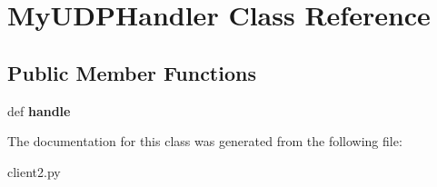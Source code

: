 \hypertarget{classclient2_1_1_my_u_d_p_handler}{\section{My\-U\-D\-P\-Handler Class Reference}
\label{classclient2_1_1_my_u_d_p_handler}
}
\subsection*{Public Member Functions}
\begin{DoxyCompactItemize}
\item 
\hypertarget{classclient2_1_1_my_u_d_p_handler_a661f73360415cc6c984be321f5a25054}{def {\bfseries handle}}\label{classclient2_1_1_my_u_d_p_handler_a661f73360415cc6c984be321f5a25054}

\end{DoxyCompactItemize}


The documentation for this class was generated from the following file\-:\begin{DoxyCompactItemize}
\item 
client2.\-py\end{DoxyCompactItemize}
